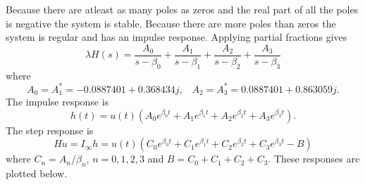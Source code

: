 \begin{excersizelist}
\begin{hardexercise}
\begin{solution}
\begin{center}
\end{center}

Because there are atleast as many poles as zeros and the real part of all the poles is negative the system is stable.  Because there are more poles than zeros the system is regular and has an impulse response.  Applying partial fractions gives
\[
\lambda H(s) = \frac{A_0}{s - \beta_0} + \frac{A_1}{s - \beta_1} + \frac{A_2}{s - \beta_2} + \frac{A_3}{s - \beta_3}
\]
where
\[
A_0 = A_1^* = -0.0887401 + 0.368434 j, \;\;\; A_2 = A_3^* = 0.0887401 + 0.863059j.
\]
The impulse response is
\[
h(t) = u(t) \left( A_0 e^{\beta_0 t} + A_1 e^{\beta_1 t} + A_2 e^{\beta_2 t} + A_3 e^{\beta_3 t}  \right).
\]
The step response is
\[
H u = I_\infty h = u(t) \left( C_0 e^{ \beta_0 t} + C_1 e^{\beta_1 t} + C_2 e^{\beta_2 t} + C_3 e^{\beta_3 t} - B  \right)
\]
where $C_n = A_n/\beta_n$, $n = 0,1,2,3$ and $B=C_0+C_1+C_2+C_3$.  These responses are plotted below.


\end{solution}
\end{hardexercise}
\end{excersizelist}
